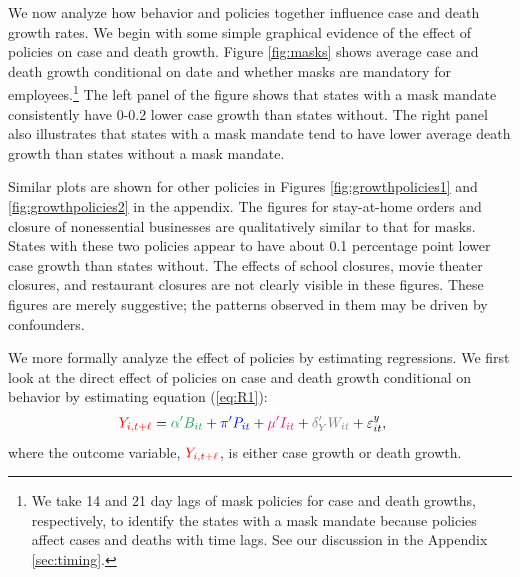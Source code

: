 \documentclass[11pt,reqno,letter]{amsart}
\theoremstyle{definition}
\def\bcolor{\color{ForestGreen}}
\def\pcolor{\color{blue}}
\def\icolor{\color{magenta}}
\def\wcolor{\color{gray}}
\def\ycolor{\color{red}}
\begin{document}
We now analyze how behavior and policies together influence case and death
growth rates. We begin with some simple graphical evidence of the
effect of policies on case and death growth. Figure \ref{fig:masks}
shows average case and death growth conditional on date and whether
masks are mandatory for employees.\footnote{We take 14 and 21 day lags of mask policies for case and death growths, respectively, to  identify the states with a mask mandate because policies affect cases and deaths with time lags. See our discussion in the Appendix \ref{sec:timing}.  } The left panel of the figure shows
that states with a mask mandate consistently have 0-0.2 lower case
growth than states without. The right panel  also illustrates that
states with a mask mandate tend to have lower average death growth than states without a mask mandate.

Similar plots are shown for other policies in Figures
\ref{fig:growthpolicies1} and \ref{fig:growthpolicies2} in the
appendix. The  figures for stay-at-home orders and closure
of nonessential businesses are qualitatively similar to that for
masks. States with these two policies appear to have about 0.1 percentage point lower
case growth  than states without. The effects of school closures, movie theater closures, and
restaurant closures are not clearly visible in these figures. These
figures are merely suggestive; the patterns observed in them may be
driven by confounders.

We more formally analyze the effect of policies by estimating
regressions. We first look at the direct effect of policies on case and death growth
conditional on behavior by estimating equation (\ref{eq:R1}):
\begin{align}
  {\ycolor  Y_{i,t+\ell}}
  & = {\bcolor \alpha ' B_{it}} + {\pcolor\pi 'P_{it}} + {\icolor \mu'I_{it}} +  {\wcolor\delta_Y 'W_{it}}  + \varepsilon^y_{it},
  \label{eq:reg-y}
\end{align}
where the outcome variable, $\ycolor Y_{i,t+\ell}$, is either case growth  or death growth.
\end{document}
